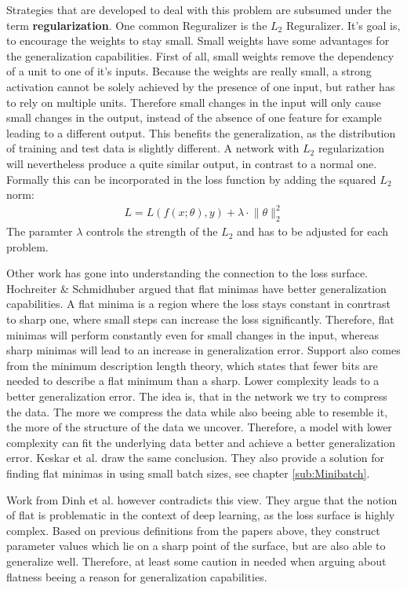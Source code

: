 Strategies that are developed to deal with this problem are subsumed under the
term \textbf{regularization}. One common Reguralizer is the $L_2$ Reguralizer.
It's goal is, to encourage the weights to stay small. Small weights have some
advantages for the generalization capabilities. First of all, small weights
remove the dependency of a unit to one of it's inputs. Because the weights are
really small, a strong activation cannot be solely achieved by the presence of
one input, but rather has to rely on multiple units. Therefore small changes in
the input will only cause small changes in the output, instead of the absence of
one feature for example leading to a different output. This benefits the
generalization, as the distribution of training and test data is slightly
different. A network with $L_2$ regularization will nevertheless produce a quite
similar output, in contrast to a normal one. Formally this can be incorporated
in the loss function by adding the squared $L_2$ norm:
\begin{align}
    L= L(f(x;\theta), y)+\lambda \cdot \lVert \theta \rVert_2^2
\end{align}
The paramter $\lambda$ controls the strength of the $L_2$ and has to be adjusted
for each problem.

Other work has gone into understanding the connection to the loss surface.
Hochreiter \& Schmidhuber \cite{hochreiter1997flat} argued that flat minimas
have better generalization capabilities. A flat minima is a region where the
loss stays constant in conrtrast to sharp one, where small steps can increase
the loss significantly. Therefore, flat minimas will perform constantly even for
small changes in the input, whereas sharp minimas will lead to an increase in
generalization error. Support also comes from the minimum description length
theory, which states that fewer bits are needed to describe a flat minimum than
a sharp. Lower complexity leads to a better generalization error. The idea is,
that in the network we try to compress the data. The more we compress the data
while also beeing able to resemble it, the more of the structure of the data we
uncover. Therefore, a model with lower complexity can fit the underlying data
better and achieve a better generalization error. Keskar et al.
\cite{keskar2016large} draw the same conclusion. They also provide a solution
for finding flat minimas in using small batch sizes, see chapter
\ref{sub:Minibatch}.

Work from Dinh et al. \cite{dinh2017sharp} however contradicts this view. They
argue that the notion of flat is problematic in the context of deep learning, as
the loss surface is highly complex. Based on previous definitions from the
papers above, they construct parameter values which lie on a sharp point of the
surface, but are also able to generalize well. Therefore, at least some caution
in needed when arguing about flatness beeing a reason for generalization
capabilities.

